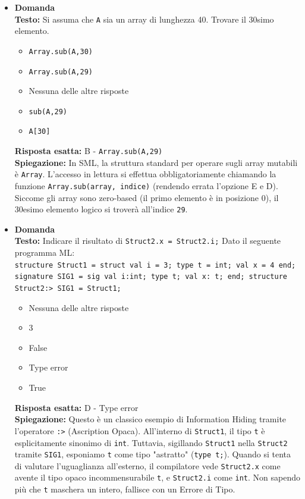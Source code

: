 \documentclass[12pt, a4paper]{article}
\newcounter{domandateoria}
\begin{document}
\begin{itemize}
    \item {}\textbf{Domanda \thedomandateoria} \\
    \textbf{Testo:} Si assuma che \texttt{A} sia un array di lunghezza 40. Trovare il 30simo elemento.
    \begin{itemize}
        \item[A)] \texttt{Array.sub(A,30)}
        \item[B)] \texttt{Array.sub(A,29)}
        \item[C)] Nessuna delle altre risposte
        \item[D)] \texttt{sub(A,29)}
        \item[E)] \texttt{A[30]}
    \end{itemize}
    \textbf{Risposta esatta:} B - \texttt{Array.sub(A,29)} \\
    \textbf{Spiegazione:} In SML, la struttura standard per operare sugli array mutabili è \texttt{Array}. L'accesso in lettura si effettua obbligatoriamente chiamando la funzione \texttt{Array.sub(array, indice)} (rendendo errata l'opzione E e D). Siccome gli array sono zero-based (il primo elemento è in posizione 0), il 30esimo elemento logico si troverà all'indice \texttt{29}.
    \vspace{0.3cm}

    \item {}\textbf{Domanda \thedomandateoria} \\
    \textbf{Testo:} Indicare il risultato di \texttt{Struct2.x = Struct2.i;} Dato il seguente programma ML: \\
    \texttt{structure Struct1 = struct val i = 3; type t = int; val x = 4 end; signature SIG1 = sig val i:int; type t; val x: t; end; structure Struct2:> SIG1 = Struct1;}
    \begin{itemize}
        \item[A)] Nessuna delle altre risposte
        \item[B)] 3
        \item[C)] False
        \item[D)] Type error
        \item[E)] True
    \end{itemize}
    \textbf{Risposta esatta:} D - Type error \\
    \textbf{Spiegazione:} Questo è un classico esempio di Information Hiding tramite l'operatore \texttt{:>} (Ascription Opaca). All'interno di \texttt{Struct1}, il tipo \texttt{t} è esplicitamente sinonimo di \texttt{int}. Tuttavia, sigillando \texttt{Struct1} nella \texttt{Struct2} tramite \texttt{SIG1}, esponiamo \texttt{t} come tipo "astratto" (\texttt{type t;}). Quando si tenta di valutare l'uguaglianza all'esterno, il compilatore vede \texttt{Struct2.x} come avente il tipo opaco incommensurabile \texttt{t}, e \texttt{Struct2.i} come \texttt{int}. Non sapendo più che \texttt{t} maschera un intero, fallisce con un Errore di Tipo.
    \vspace{0.3cm}


\end{itemize}
\end{document}
